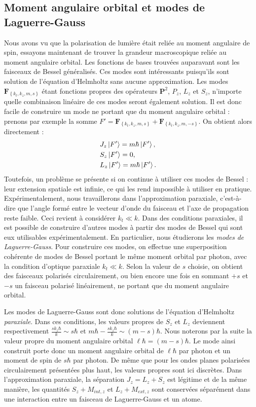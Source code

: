\subsection{Moment angulaire orbital et modes de Laguerre-Gauss}
Nous avons vu que la polarisation de lumière était reliée au moment angulaire de spin, essayons maintenant de trouver la grandeur macroscopique reliée au moment angulaire orbital. 
Les fonctions de bases trouvées auparavant sont les faisceaux de Bessel généralisés. Ces modes sont intéressants puisqu'ils sont solution de l'équation d'Helmholtz sans aucune approximation. Les modes $\bm{F}_{\left\{k_t,k_z,m,s\right\}}$ étant fonctions propres des opérateurs $\bm{P}^2$, $P_z$, $L_z$ et $S_z$, n'importe quelle combinaison linéaire de ces modes seront également solution. Il est donc facile de construire un mode ne portant que du moment angulaire orbital : prenons par exemple la somme $F'=\bm{F}_{\left\{k_t,k_z,m,s\right\}}+\bm{F}_{\left\{k_t,k_z,m,-s\right\}}$. On obtient alors directement :
\begin{align*}
&J_z\ket{F'} = m\hbar\ket{F'},\\
&S_z\ket{F'} = 0,\\
&L_z\ket{F'} = m\hbar\ket{F'}.
\end{align*}
Toutefois, un problème se présente si on continue à utiliser ces modes de Bessel : leur extension spatiale est infinie, ce qui les rend impossible à utiliser en pratique. Expérimentalement, nous travaillerons dans l'approximation paraxiale, c'est-à-dire que l'angle formé entre le vecteur d'onde du faisceau et l'axe de propagation reste faible. Ceci revient à considérer $k_t \ll k$. Dans des conditions paraxiales, il est possible de construire d'autres modes à partir des modes de Bessel qui sont eux utilisables expérimentalement. En particulier, nous étudierons les \textit{modes de Laguerre-Gauss}. 
Pour construire ces modes, on effectue une superposition cohérente de modes de Bessel portant le même moment orbital par photon, avec la condition d'optique paraxiale $k_t \ll k$. Selon la valeur de $s$ choisie, on obtient des faisceaux polarisés circulairement, ou bien encore une fois en sommant $+s$ et $-s$ un faisceau polarisé linéairement, ne portant que du moment angulaire orbital.

Les modes de Laguerre-Gauss sont donc solutions de l'équation d'Helmholtz \textit{paraxiale}. Dans ces conditions, les valeurs propres de $S_z$ et $L_z$ deviennent respectivement $\frac{sk_z\hbar}{k}\sim s\hbar$ et $m\hbar-\frac{sk_z\hbar}{k}\sim (m-s)\hbar$. Nous noterons par la suite la valeur propre du moment angulaire orbital $\ell\hbar = (m-s)\hbar$. Le mode ainsi construit porte donc un moment angulaire orbital de $\ell\hbar$ par photon et un moment de spin de $s\hbar$ par photon.
De même que pour les ondes planes polarisées circulairement présentées plus haut, les valeurs propres sont ici discrètes. Dans l'approximation paraxiale, la séparation $J_z=L_z+S_z$ est légitime et de la même manière, les quantités $S_z+M_{int,z}$ et $L_z+M_{ext,z}$ sont conservées séparément dans une interaction entre un faisceau de Laguerre-Gauss et un atome.

